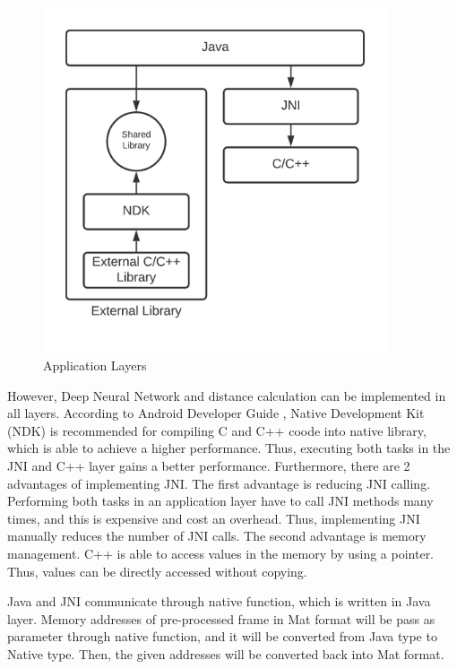         \begin{figure}[!ht]
            \centering
            \includegraphics[width=4in]{images/chapter3/application-layers.png}
            \caption{Application Layers}
            \label{systemOverview}
        \end{figure}

        However, Deep Neural Network and distance calculation can be implemented in all layers.
        According to Android Developer Guide \cite{ANDROID-01},
        Native Development Kit (NDK) is recommended for compiling C and C++ coode into native library,
        which is able to achieve a higher performance.
        Thus, executing both tasks in the JNI and C++ layer gains a better performance.
        Furthermore, there are 2 advantages of implementing JNI.
            The first advantage is reducing JNI calling. Performing both tasks in an application layer have to call JNI methods many times,
                and this is expensive and cost an overhead.
                Thus, implementing JNI manually reduces the number of JNI calls.
            The second advantage is memory management. C++ is able to access values in the memory by using a pointer.
                Thus, values can be directly accessed without copying.

        Java and JNI communicate through native function, which is written in Java layer.
        Memory addresses of pre-processed frame in Mat format will be pass as parameter through native function,
        and it will be converted from Java type to Native type.
        Then, the given addresses will be converted back into Mat format.

